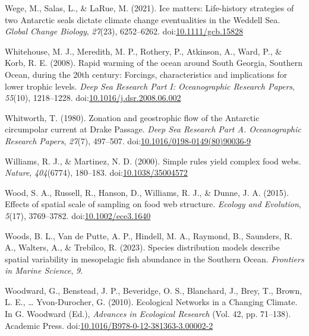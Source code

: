 \documentclass[
]{article}
\newlength{\cslhangindent}
\newlength{\cslentryspacingunit} %
\newenvironment{CSLReferences}[2] %
 {%
  \setlength{\parindent}{0pt}
  \ifodd #1
  \let\oldpar\par
  \def\par{\hangindent=\cslhangindent\oldpar}
  \fi
  \setlength{\parskip}{#2\cslentryspacingunit}
 }%
 {}
\begin{document}
\begin{CSLReferences}{1}{0}
\leavevmode{}%
Wege, M., Salas, L., \& LaRue, M. (2021). Ice matters: {Life-history}
strategies of two {Antarctic} seals dictate climate change eventualities
in the {Weddell Sea}. \emph{Global Change Biology}, \emph{27}(23),
6252--6262.
doi:\href{https://doi.org/10.1111/gcb.15828}{10.1111/gcb.15828}

\leavevmode{}%
Whitehouse, M. J., Meredith, M. P., Rothery, P., Atkinson, A., Ward, P.,
\& Korb, R. E. (2008). Rapid warming of the ocean around {South
Georgia}, {Southern Ocean}, during the 20th century: {Forcings},
characteristics and implications for lower trophic levels. \emph{Deep
Sea Research Part I: Oceanographic Research Papers}, \emph{55}(10),
1218--1228.
doi:\href{https://doi.org/10.1016/j.dsr.2008.06.002}{10.1016/j.dsr.2008.06.002}

\leavevmode{}%
Whitworth, T. (1980). Zonation and geostrophic flow of the {Antarctic}
circumpolar current at {Drake Passage}. \emph{Deep Sea Research Part A.
Oceanographic Research Papers}, \emph{27}(7), 497--507.
doi:\href{https://doi.org/10.1016/0198-0149(80)90036-9}{10.1016/0198-0149(80)90036-9}

\leavevmode{}%
Williams, R. J., \& Martinez, N. D. (2000). Simple rules yield complex
food webs. \emph{Nature}, \emph{404}(6774), 180--183.
doi:\href{https://doi.org/10.1038/35004572}{10.1038/35004572}

\leavevmode{}%
Wood, S. A., Russell, R., Hanson, D., Williams, R. J., \& Dunne, J. A.
(2015). Effects of spatial scale of sampling on food web structure.
\emph{Ecology and Evolution}, \emph{5}(17), 3769--3782.
doi:\href{https://doi.org/10.1002/ece3.1640}{10.1002/ece3.1640}

\leavevmode{}%
Woods, B. L., Van de Putte, A. P., Hindell, M. A., Raymond, B.,
Saunders, R. A., Walters, A., \& Trebilco, R. (2023). Species
distribution models describe spatial variability in mesopelagic fish
abundance in the {Southern Ocean}. \emph{Frontiers in Marine Science},
\emph{9}.

\leavevmode{}%
Woodward, G., Benstead, J. P., Beveridge, O. S., Blanchard, J., Brey,
T., Brown, L. E., \ldots{} Yvon-Durocher, G. (2010). Ecological
{Networks} in a {Changing Climate}. In G. Woodward (Ed.), \emph{Advances
in {Ecological Research}} (Vol. 42, pp. 71--138). {Academic Press}.
doi:\href{https://doi.org/10.1016/B978-0-12-381363-3.00002-2}{10.1016/B978-0-12-381363-3.00002-2}


\end{CSLReferences}
\end{document}
